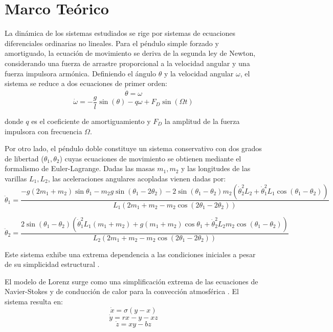 \section{Marco Teórico}

La dinámica de los sistemas estudiados se rige por sistemas de ecuaciones diferenciales ordinarias no lineales. Para el péndulo simple forzado y amortiguado, la ecuación de movimiento se deriva de la segunda ley de Newton, considerando una fuerza de arrastre proporcional a la velocidad angular y una fuerza impulsora armónica. Definiendo el ángulo $\theta$ y la velocidad angular $\omega$, el sistema se reduce a dos ecuaciones de primer orden:
\begin{equation}
    \dot{\theta} = \omega
\end{equation}
\begin{equation}
    \dot{\omega} = -\frac{g}{l}\sin(\theta) - q\omega + F_D \sin(\Omega t)
\end{equation}

donde $q$ es el coeficiente de amortiguamiento y $F_D$ la amplitud de la fuerza impulsora con frecuencia $\Omega$.


Por otro lado, el péndulo doble constituye un sistema conservativo con dos grados de libertad ($\theta_1, \theta_2$) cuyas ecuaciones de movimiento se obtienen mediante el formalismo de Euler-Lagrange. Dadas las masas $m_1, m_2$ y las longitudes de las varillas $L_1, L_2$, las aceleraciones angulares acopladas vienen dadas por:
\begin{equation}
    \ddot{\theta}_1 = \frac{-g(2m_1 + m_2)\sin\theta_1 - m_2 g \sin(\theta_1 - 2\theta_2) - 2\sin(\theta_1 - \theta_2)m_2\left(\dot{\theta}_2^2 L_2 + \dot{\theta}_1^2 L_1 \cos(\theta_1 - \theta_2)\right)}{L_1 \left(2m_1 + m_2 - m_2 \cos(2\theta_1 - 2\theta_2)\right)}
\end{equation}

\begin{equation}
    \ddot{\theta}_2 = \frac{2\sin(\theta_1 - \theta_2)\left(\dot{\theta}_1^2 L_1 (m_1 + m_2) + g(m_1 + m_2)\cos\theta_1 + \dot{\theta}_2^2 L_2 m_2 \cos(\theta_1 - \theta_2)\right)}{L_2 \left(2m_1 + m_2 - m_2 \cos(2\theta_1 - 2\theta_2)\right)}
\end{equation}

Este sistema exhibe una extrema dependencia a las condiciones iniciales a pesar de su simplicidad estructural \citep{pend_doble}.
 

El modelo de Lorenz surge como una simplificación extrema de las ecuaciones de Navier-Stokes y de conducción de calor para la convección atmosférica \citep{Lorenz}. El sistema resulta en:
\begin{equation}
    \dot{x} = \sigma (y - x)
\end{equation}
\begin{equation}
    \dot{y} = rx - y - xz
\end{equation}
\begin{equation}
    \dot{z} = xy - bz
\end{equation}

